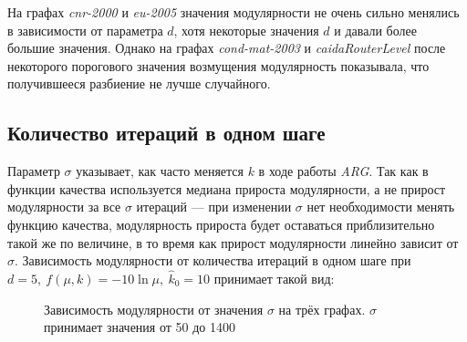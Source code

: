 На графах \emph{cnr-2000} и \emph{eu-2005} значения модулярности не очень сильно менялись в зависимости от параметра $d$, хотя некоторые значения $d$ и давали более большие значения. Однако на графах \emph{cond-mat-2003} и \emph{caidaRouterLevel} после некоторого порогового значения возмущения модулярность показывала, что получившееся разбиение не лучше случайного.



\subsection{Количество итераций в одном шаге}

Параметр $\sigma$ указывает, как часто меняется $k$ в ходе работы \emph{ARG}. Так как в функции качества используется медиана прироста модулярности, а не прирост модулярности за все $\sigma$ итераций --- при изменении $\sigma$ нет необходимости менять функцию качества, модулярность прироста будет оставаться приблизительно такой же по величине, в то время как прирост модулярности линейно зависит от $\sigma$. Зависимость модулярности от количества итераций в одном шаге при $d = 5,\ f(\mu, k) = -10 \ln \mu,\ \hat{k}_0 = 10$ принимает такой вид:

\begin{figure}[H]
	\columnwidth
	\columnwidth
	\caption{Зависимость модулярности от значения $\sigma$ на трёх графах. $\sigma$ принимает значения от 50 до 1400}
\end{figure}

